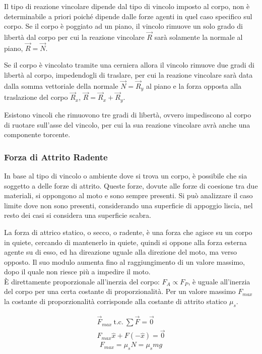 \documentclass{article}
\numberwithin{equation}{subsection}
\begin{document}
Il tipo di reazione vincolare dipende dal tipo di vincolo imposto al corpo, non è determinabile a priori poiché dipende dalle forze agenti in quel caso specifico sul 
corpo. Se il corpo è poggiato ad un piano, il vincolo rimuove un solo grado di libertà dal corpo per 
cui la reazione vincolare $\vec{R}$ sarà solamente la normale al piano, $\vec{R}=\vec{N}$.  


Se il corpo è vincolato tramite una cerniera allora il vincolo rimuove due gradi di libertà al corpo, impedendogli di traslare, per cui la reazione vincolare sarà data 
dalla somma vettoriale della normale $\vec{N}=\vec{R}_y$ al piano e la forza opposta alla traslazione del corpo $\vec{R}_x$, $\vec{R}=\vec{R}_x+\vec{R}_y$.


Esistono vincoli che rimuovono tre gradi di libertà, ovvero impediscono al corpo di ruotare sull'asse del vincolo, per cui la sua reazione vincolare avrà anche una componente 
torcente. 

\subsubsection{Forza di Attrito Radente}
In base al tipo di vincolo o ambiente dove si trova un corpo, è possibile che sia soggetto a delle forze di attrito. Queste forze, dovute alle forze di coesione tra due 
materiali, si oppongono al moto e sono sempre presenti. Si può analizzare il caso limite dove non sono presenti, considerando una superficie di appoggio liscia, nel resto 
dei casi si considera una superficie scabra.




La forza di attrico statico, o secco, o radente, è una forza 
che agisce su un corpo in quiete, cercando di mantenerlo in 
quiete, quindi si oppone alla forza esterna agente su di esso, 
ed ha direazione uguale alla direzione del moto, ma verso 
opposto. Il suo modulo aumenta fino al raggiungimento di 
un valore massimo, dopo il quale non riesce più a impedire 
il moto.
\\
\`{E} direttamente proporzionale all'inerzia del corpo: $F_A\propto F_P$, è uguale all'inerzia del corpo per una certa costante di proporzionalità. Per un valore massimo 
$F_{max}$ la costante di proporzionalità corrisponde alla costante di attrito statico $\mu_s$. 

\begin{gather*}
    \vec{F}_{max}\:\mbox{t.c.}\:\sum\vec{F}=\vec{0}\\
    F_{max}\hat{x}+F(-\hat{x})=\vec{0}
\end{gather*}
\begin{equation}
    F_{max}=\mu_sN=\mu_smg
\end{equation}
\end{document}
